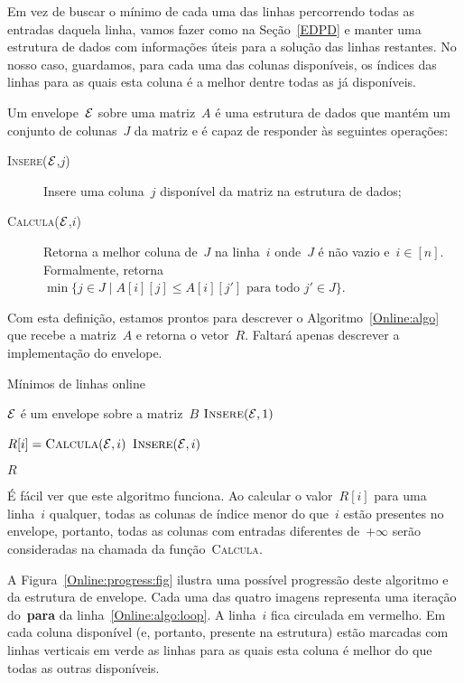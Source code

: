 Em vez de buscar o mínimo de cada uma das linhas percorrendo todas as entradas daquela linha, vamos fazer como na Seção~\ref{EDPD} e manter uma estrutura de dados com informações úteis para a solução das linhas restantes. No nosso caso, guardamos, para cada uma das colunas disponíveis, os índices das linhas para as quais esta coluna é a melhor dentre todas as já disponíveis. 

\begin{defi}
Um envelope~$\mathcal{E}$ sobre uma matriz~$A$ é uma estrutura de dados que mantém um conjunto de colunas~$J$ da matriz e é capaz de responder às seguintes operações:

\begin{description}
    \item[\textsc{Insere}($\mathcal{E}$,$j$)] Insere uma coluna~$j$ disponível da matriz na estrutura de dados;
    \item[\textsc{Calcula}($\mathcal{E}$,$i$)] Retorna a melhor coluna de~$J$ na linha~$i$ onde~$J$ é não vazio e~${ i \in [n] }$. Formalmente, retorna~${ \min\{j \in J \mid A[i][j] \leq A[i][j'] \text{ para todo } j' \in J\} }$.
\end{description}
\end{defi}

Com esta definição, estamos prontos para descrever o Algoritmo~\ref{Online:algo} que recebe a matriz~$A$ e retorna o vetor~$R$. Faltará apenas descrever a implementação do envelope.

\begin{algorithm}[h]
\caption{Mínimos de linhas online}
\label{Online:algo}
\begin{algorithmic}[1]
    \State $\mathcal{E}$ é um envelope sobre a matriz~$B$
    \State $\textsc{Insere}(\mathcal{E},1)$

     \label{Online:algo:loop}
        \State $R[i] = \textsc{Calcula}(\mathcal{E},i)$
        \State $\textsc{Insere}(\mathcal{E},i)$
    \EndFor

    \State \Return $R$
\EndFunction
\end{algorithmic}
\end{algorithm}

É fácil ver que este algoritmo funciona. Ao calcular o valor~$R[i]$ para uma linha~$i$ qualquer, todas as colunas de índice menor do que~$i$ estão presentes no envelope, portanto, todas as colunas com entradas diferentes de~$+\infty$ serão consideradas na chamada da função~\textsc{Calcula}.

A Figura~\ref{Online:progress:fig} ilustra uma possível progressão deste algoritmo e da estrutura de envelope. Cada uma das quatro imagens representa uma iteração do~\textbf{para} da linha~\ref{Online:algo:loop}. A linha~$i$ fica circulada em vermelho. Em cada coluna disponível (e, portanto, presente na estrutura) estão marcadas com linhas verticais em verde as linhas para as quais esta coluna é melhor do que todas as outras disponíveis.

